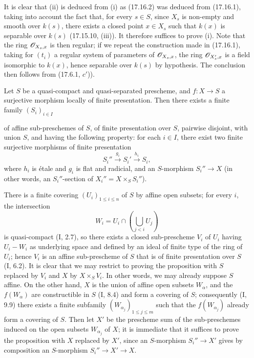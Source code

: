 It is clear that (ii) is deduced from (i) as (17.16.2) was deduced from (17.16.1), taking into account the fact that, for every $s\in S$, since $X_s$ is non-empty and smooth over $k(s)$, there exists a closed point $x\in X_s$ such that $k(x)$ is separable over $k(s)$ (17.15.10, (iii)). It therefore suffices to prove (i). Note that the ring $\mathscr{O}_{X_s,x}$ is then regular; if we repeat the construction made in (17.16.1), taking for $(t_i)$ a regular system of parameters of $\mathscr{O}_{X_s,x}$, the ring $\mathscr{O}_{X'_s,x}$ is a field isomorphic to $k(x)$, hence separable over $k(s)$ by hypothesis. The conclusion then follows from (17.6.1, $c'$)).

\begin{proposition}[17.16.4]
\label{IV.17.16.4}
Let $S$ be a quasi-compact and quasi-separated prescheme, and $f:X\to S$ a surjective morphism locally of finite presentation. Then there exists a finite family $(S_i)_{i\in I}$


of affine sub-preschemes of $S$, of finite presentation over $S$, pairwise disjoint, with union $S$, and having the following property: for each $i\in I$, there exist two finite surjective morphisms of finite presentation
\[
  S_i''\xrightarrow{g_i}S_i'\xrightarrow{h_i}S_i,
\]
where $h_i$ is étale and $g_i$ is flat and radicial, and an $S$-morphism $S_i''\to X$ (in other words, an $S_i''$-section of $X_i''=X\times_S S_i''$).
\end{proposition}

There is a finite covering $(U_i)_{1\leq i\leq n}$ of $S$ by affine open subsets; for every $i$, the intersection
\[
  W_i=U_i\cap\left(\bigcup_{j<i}U_j\right)
\]
is quasi-compact (I, 2.7), so there exists a closed sub-prescheme $V_i$ of $U_i$ having $U_i-W_i$ as underlying space and defined by an ideal of finite type of the ring of $U_i$; hence $V_i$ is an affine sub-prescheme of $S$ that is of finite presentation over $S$ (I, 6.2). It is clear that we may restrict to proving the proposition with $S$ replaced by $V_i$ and $X$ by $X\times_S V_i$. In other words, we may already suppose $S$ affine. On the other hand, $X$ is the union of affine open subsets $W_\alpha$, and the $f(W_\alpha)$ are constructible in $S$ (I, 8.4) and form a covering of $S$; consequently (I, 9.9) there exists a finite subfamily $(W_{\alpha_j})_{1\leq j\leq m}$ such that the $f(W_{\alpha_j})$ already form a covering of $S$. Then let $X'$ be the prescheme sum of the sub-preschemes induced on the open subsets $W_{\alpha_j}$ of $X$; it is immediate that it suffices to prove the proposition with $X$ replaced by $X'$, since an $S$-morphism $S_i''\to X'$ gives by composition an $S$-morphism $S_i''\to X'\to X$.

